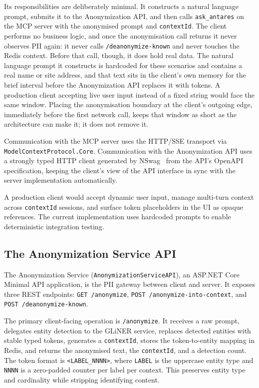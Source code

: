 Its responsibilities are deliberately minimal. It constructs a natural language prompt, submits it to the Anonymization API, and then calls \texttt{ask\_antares} on the MCP server with the anonymised prompt and \texttt{contextId}. The client performs no business logic, and once the anonymisation call returns it never observes PII again: it never calls \texttt{/deanonymize-known} and never touches the Redis context. Before that call, though, it does hold real data. The natural language prompt it constructs is hardcoded for these scenarios and contains a real name or site address, and that text sits in the client's own memory for the brief interval before the Anonymization API replaces it with tokens. A production client accepting live user input instead of a fixed string would face the same window. Placing the anonymisation boundary at the client's outgoing edge, immediately before the first network call, keeps that window as short as the architecture can make it; it does not remove it.

Communication with the MCP server uses the HTTP/SSE transport via \texttt{ModelContextProtocol.Core}. Communication with the Anonymization API uses a strongly typed HTTP client generated by NSwag~\cite{nswag2015} from the API's OpenAPI specification, keeping the client's view of the API interface in sync with the server implementation automatically.

A production client would accept dynamic user input, manage multi-turn context across \texttt{contextId} sessions, and surface token placeholders in the UI as opaque references. The current implementation uses hardcoded prompts to enable deterministic integration testing.

\subsection{The Anonymization Service API}
\label{subsec:arch_anonymization_service}

The Anonymization Service (\texttt{AnonymizationServiceAPI}), an ASP.NET Core Minimal API application, is the PII gateway between client and server. It exposes three REST endpoints: \texttt{GET /anonymize}, \texttt{POST /anonymize-into-context}, and \texttt{POST /deanonymize-known}.

The primary client-facing operation is \texttt{/anonymize}. It receives a raw prompt, delegates entity detection to the GLiNER service, replaces detected entities with stable typed tokens, generates a \texttt{contextId}, stores the token-to-entity mapping in Redis, and returns the anonymised text, the \texttt{contextId}, and a detection count. The token format is \texttt{<LABEL\_NNNN>}, where \texttt{LABEL} is the uppercase entity type and \texttt{NNNN} is a zero-padded counter per label per context. This preserves entity type and cardinality while stripping identifying content.

